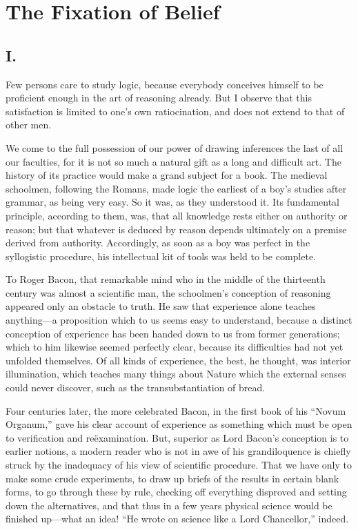 
\author{Charles Sanders Peirce}
\chapter{The Fixation of Belief}

\section{I.}

Few persons care to study logic, because everybody conceives himself
to be proficient enough in the art of reasoning already. But I observe
that this satisfaction is limited to one's own ratiocination, and does
not extend to that of other men.

We come to the full possession of our power of drawing inferences the
last of all our faculties, for it is not so much a natural gift as a
long and difficult art. The history of its practice would make a grand
subject for a book. The medieval schoolmen, following the Romans, made
logic the earliest of a boy's studies after grammar, as being very
easy. So it was, as they understood it. Its fundamental principle,
according to them, was, that all knowledge rests either on authority
or reason; but that whatever is deduced by reason depends ultimately
on a premise derived from authority. Accordingly, as soon as a boy
was perfect in the syllogistic procedure, his intellectual kit of
tools was held to be complete.

To Roger Bacon, that remarkable mind who in the middle of the
thirteenth century was almost a scientific man, the schoolmen's
conception of reasoning appeared only an obstacle to truth. He saw
that experience alone teaches anything---a proposition which to us
seems easy to understand, because a distinct conception of experience
has been handed down to us from former generations; which to him
likewise seemed perfectly clear, because its difficulties had not yet
unfolded themselves. Of all kinds of experience, the best, he thought,
was interior illumination, which teaches many things about Nature
 which the external senses could never discover, such as the
transubstantiation of bread.

Four centuries later, the more celebrated Bacon, in the first book of
his ``Novum Organum,'' gave his clear account of experience as
something which must be open to verification and re\"{e}xamination.
But, superior as Lord Bacon's conception is to earlier notions, a
modern reader who is not in awe of his grandiloquence is chiefly
struck by the inadequacy of his view of scientific procedure. That we
have only to make some crude experiments, to draw up briefs of the
results in certain blank forms, to go through these by rule, checking
off everything disproved and setting down the alternatives, and that
thus in a few years physical science would be finished up---what an
idea! ``He wrote on science like a Lord Chancellor,'' indeed.

